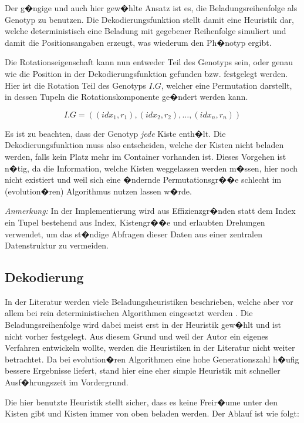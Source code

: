 \documentclass[a4paper,abstracton,12pt]{scrartcl}
\begin{document}
Der g�ngige und auch hier gew�hlte Ansatz ist es, die Beladungsreihenfolge als Genotyp zu benutzen. Die Dekodierungsfunktion stellt damit eine Heuristik dar, welche deterministisch eine Beladung mit gegebener Reihenfolge simuliert und damit die Positionsangaben erzeugt, was wiederum den Ph�notyp ergibt.

Die Rotationseigenschaft kann nun entweder Teil des Genotyps sein, oder genau wie die Position in der Dekodierungsfunktion gefunden bzw. festgelegt werden. Hier ist die Rotation Teil des Genotyps $I.G$, welcher eine Permutation darstellt, in dessen Tupeln die Rotationskomponente ge�ndert werden kann.

\begin{equation}
	I.G = ((idx_1, r_1),(idx_2, r_2),\ldots,(idx_n, r_n))
\end{equation}

Es ist zu beachten, dass der Genotyp \emph{jede} Kiste enth�lt. Die Dekodierungsfunktion muss also entscheiden, welche der Kisten nicht beladen werden, falls kein Platz mehr im Container vorhanden ist. Dieses Vorgehen ist n�tig, da die Information, welche Kisten weggelassen werden m�ssen, hier noch nicht existiert und weil sich eine �ndernde Permutationsgr��e schlecht im (evolution�ren) Algorithmus nutzen lassen w�rde.

\emph{Anmerkung:} In der Implementierung wird aus Effizienzgr�nden statt dem Index ein Tupel bestehend aus Index, Kistengr��e und erlaubten Drehungen verwendet, um das st�ndige Abfragen dieser Daten aus einer zentralen Datenstruktur zu vermeiden.

\subsection{Dekodierung}

In der Literatur werden viele Beladungsheuristiken beschrieben, welche aber vor allem bei rein deterministischen Algorithmen eingesetzt werden \cite{bortfeldt2008}\cite{wenqi2009}\cite{eley2002}\cite{bortfeldt1997}. 
Die Beladungsreihenfolge wird dabei meist erst in der Heuristik gew�hlt und ist nicht vorher festgelegt. Aus diesem Grund und weil der Autor ein eigenes Verfahren entwickeln wollte, werden die Heuristiken in der Literatur nicht weiter betrachtet. Da bei evolution�ren Algorithmen eine hohe Generationszahl h�ufig bessere Ergebnisse liefert, stand hier eine eher simple Heuristik mit schneller Ausf�hrungszeit im Vordergrund.

Die hier benutzte Heuristik stellt sicher, dass es keine Freir�ume unter den Kisten gibt und Kisten immer von oben beladen werden. Der Ablauf ist wie folgt:
\end{document}
